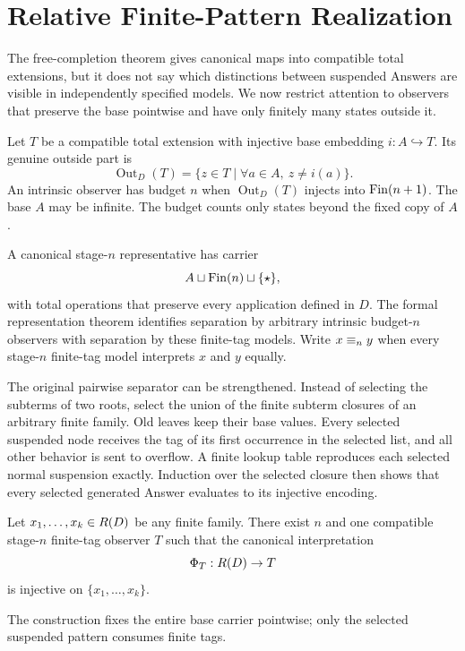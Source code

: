 \section{Relative Finite-Pattern Realization}
\label{sec:finite-separation}

The free-completion theorem gives canonical maps into compatible total
extensions, but it does not say which distinctions between suspended Answers
are visible in independently specified models.  We now restrict attention to
observers that preserve the base pointwise and have only finitely many states
outside it.

Let $T$ be a compatible total extension with injective base embedding
$i:A\hookrightarrow T$.  Its genuine outside part is
\[
 \operatorname{Out}_D(T)=\{z\in T\mid \forall a\in A,\ z\ne i(a)\}.
\]
An intrinsic observer has budget $n$ when
$\operatorname{Out}_D(T)$ injects into $\operatorname{Fin}(n+1)$.  The base $A$ may be
infinite.  The budget counts only states beyond the fixed copy of $A$.

A canonical stage-$n$ representative has carrier
\[
 A\sqcup\operatorname{Fin}(n)\sqcup\{\star\},
\]
with total operations that preserve every application defined in $D$.  The
formal representation theorem identifies separation by arbitrary intrinsic
budget-$n$ observers with separation by these finite-tag models.  Write
$x\mathrel{\equiv_{n}}y$ when every stage-$n$ finite-tag model interprets $x$ and $y$
equally.

The original pairwise separator can be strengthened.  Instead of selecting the
subterms of two roots, select the union of the finite subterm closures of an
arbitrary finite family.  Old leaves keep their base values.  Every selected
suspended node receives the tag of its first occurrence in the selected list,
and all other behavior is sent to overflow.  A finite lookup table reproduces
each selected normal suspension exactly.  Induction over the selected closure
then shows that every selected generated Answer evaluates to its injective
encoding.

\begin{theorem}
\label{thm:finite-pattern-realization}
Let $x_1,\ldots,x_k\in R(D)$ be any finite family.  There exist $n$ and one
compatible stage-$n$ finite-tag observer $T$ such that the canonical
interpretation
\[
 \Phi_T:R(D)\to T
\]
is injective on $\{x_1,\ldots,x_k\}$.
\end{theorem}

The construction fixes the entire base carrier pointwise; only the selected
suspended pattern consumes finite tags.

